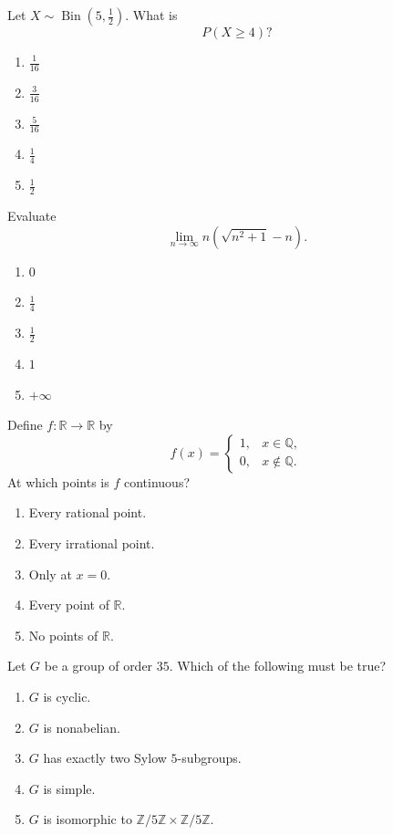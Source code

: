 \begin{exercise}
Let $X\sim\operatorname{Bin}(5,\frac12)$.
What is
\[
P(X\geq4)?
\]
\begin{enumerate}[label=(\Alph*)]
\item $\frac1{16}$
\item $\frac3{16}$
\item $\frac5{16}$
\item $\frac14$
\item $\frac12$
\end{enumerate}
\end{exercise}

\begin{exercise}
Evaluate
\[
\lim_{n\to\infty}
n\left(\sqrt{n^2+1}-n\right).
\]
\begin{enumerate}[label=(\Alph*)]
\item $0$
\item $\frac14$
\item $\frac12$
\item $1$
\item $+\infty$
\end{enumerate}
\end{exercise}

\begin{exercise}
Define $f:\mathbb R\to\mathbb R$ by
\[
f(x)=
\begin{cases}
1,&x\in\mathbb Q,\\
0,&x\notin\mathbb Q.
\end{cases}
\]
At which points is $f$ continuous?
\begin{enumerate}[label=(\Alph*)]
\item Every rational point.
\item Every irrational point.
\item Only at $x=0$.
\item Every point of $\mathbb R$.
\item No points of $\mathbb R$.
\end{enumerate}
\end{exercise}

\begin{exercise}
Let $G$ be a group of order $35$.
Which of the following must be true?
\begin{enumerate}[label=(\Alph*)]
\item $G$ is cyclic.
\item $G$ is nonabelian.
\item $G$ has exactly two Sylow $5$-subgroups.
\item $G$ is simple.
\item $G$ is isomorphic to
$\mathbb Z/5\mathbb Z\times\mathbb Z/5\mathbb Z$.
\end{enumerate}
\end{exercise}

